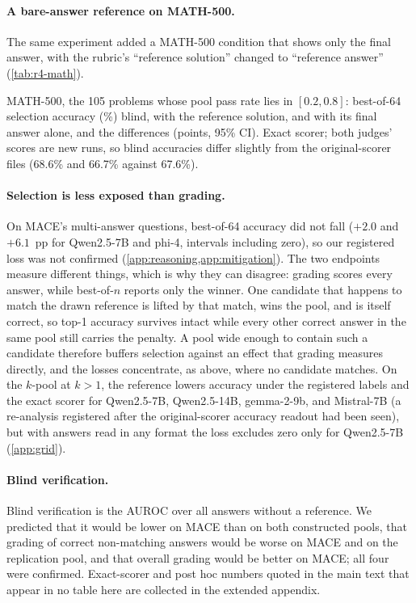 \paragraph{A bare-answer reference on MATH-500.}
The same experiment added a MATH-500 condition that shows only the final answer, with the rubric's ``reference solution'' changed to ``reference answer'' (\cref{tab:r4-math}).\pre

\begin{table}[htbp]
\centering
\caption{MATH-500, the 105 problems whose pool pass rate lies in $[0.2,0.8]$: best-of-64 selection accuracy (\%) blind, with the reference solution, and with its final answer alone, and the differences (points, 95\% CI). Exact scorer; both judges' scores are new runs, so blind accuracies differ slightly from the original-scorer files (68.6\% and 66.7\% against 67.6\%).\pre}
\label{tab:r4-math}
\footnotesize
\setlength{\tabcolsep}{3pt}
\begin{adjustbox}{max width=\linewidth}\end{adjustbox}
\end{table}

\paragraph{Selection is less exposed than grading.}
On \textsc{MACE}'s multi-answer questions, best-of-64 accuracy did not fall ($+2.0$ and $+6.1$~pp for Qwen2.5-7B and phi-4, intervals including zero), so our registered loss was not confirmed (\cref{app:reasoning,app:mitigation}). The two endpoints measure different things, which is why they can disagree: grading scores every answer, while best-of-$n$ reports only the winner. One candidate that happens to match the drawn reference is lifted by that match, wins the pool, and is itself correct, so top-1 accuracy survives intact while every other correct answer in the same pool still carries the penalty. A pool wide enough to contain such a candidate therefore buffers selection against an effect that grading measures directly, and the losses concentrate, as above, where no candidate matches. On the $k$-pool at $k{>}1$, the reference lowers accuracy under the registered labels and the exact scorer for Qwen2.5-7B, Qwen2.5-14B, gemma-2-9b, and Mistral-7B (a re-analysis registered after the original-scorer accuracy readout had been seen), but with answers read in any format the loss excludes zero only for Qwen2.5-7B (\cref{app:grid}).

\paragraph{Blind verification.}
Blind verification is the AUROC over all answers without a reference. We predicted that it would be lower on \textsc{MACE} than on both constructed pools, that grading of correct non-matching answers would be worse on \textsc{MACE} and on the replication pool, and that overall grading would be better on \textsc{MACE}; all four were confirmed.\pre{} Exact-scorer and post hoc numbers quoted in the main text that appear in no table here are collected in the extended appendix.

